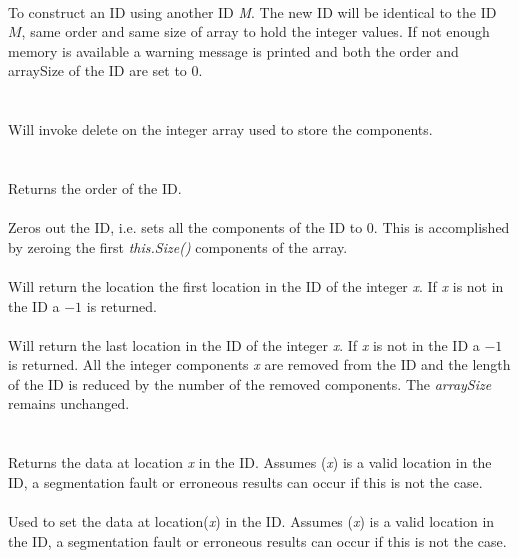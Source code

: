   \\
To construct an ID using another ID {\em M}. The new ID will be
identical to the ID $M$, same order and same size of array to hold the
integer values. If not enough memory is available a
warning message is printed and both the order and arraySize of the ID
are set to $0$. \\

 \\
\\ 
Will invoke delete on the integer array used to store the components. \\

  \\
 \\
Returns the order of the ID. \\

 \\
Zeros out the ID, i.e. sets all the components of the ID to
$0$. This is accomplished by zeroing the first {\em this.Size()}
components of the array. \\

 \\
Will return the location the first location in the ID of the integer
{\em x}. If {\em x} is not in the ID a $-1$ is returned. \\

 \\
Will return the last location in the ID of the integer
{\em x}. If {\em x} is not in the ID a $-1$ is returned. All the integer
components {\em x} are removed from the ID and the length of the ID is
reduced by the number of the removed components. The {\em arraySize}
remains unchanged. \\ 


  \\
 \\
Returns the data at location {\em x} in the ID. Assumes ({\em x})
is a valid location in the ID, a segmentation fault or erroneous
results can occur if this is not the case. \\

 \\
Used to set the data at location({\em x}) in the ID. Assumes ({\em x})
is a valid location in the ID, a segmentation fault or erroneous
results can occur if this is not the case. \\

